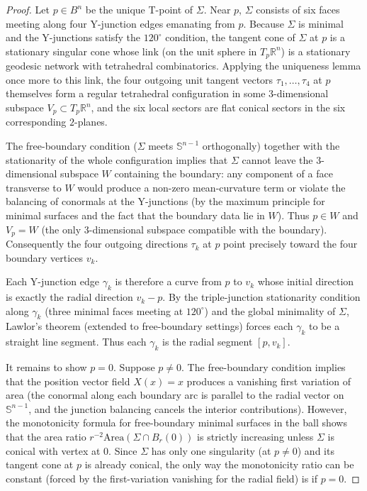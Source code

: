 \documentclass[10pt,a4paper]{amsart}
\begin{document}
\begin{proof}
Let \(p \in B^n\) be the unique T-point of \(\Sigma\). Near \(p\), \(\Sigma\) consists of six faces meeting along four Y-junction edges emanating from \(p\). Because \(\Sigma\) is minimal and the Y-junctions satisfy the \(120^\circ\) condition, the tangent cone of \(\Sigma\) at \(p\) is a stationary singular cone whose link (on the unit sphere in \(T_p\mathbb{R}^n\)) is a stationary geodesic network with tetrahedral combinatorics. Applying the uniqueness lemma once more to this link, the four outgoing unit tangent vectors \(\tau_1,\dots,\tau_4\) at \(p\) themselves form a regular tetrahedral configuration in some \(3\)-dimensional subspace \(V_p \subset T_p\mathbb{R}^n\), and the six local sectors are flat conical sectors in the six corresponding \(2\)-planes.
\medskip

The free-boundary condition (\(\Sigma\) meets \(\mathbb{S}^{n-1}\) orthogonally) together with the stationarity of the whole configuration implies that \(\Sigma\) cannot leave the \(3\)-dimensional subspace \(W\) containing the boundary: any component of a face transverse to \(W\) would produce a non-zero mean-curvature term or violate the balancing of conormals at the Y-junctions (by the maximum principle for minimal surfaces and the fact that the boundary data lie in \(W\)). Thus \(p \in W\) and \(V_p = W\) (the only \(3\)-dimensional subspace compatible with the boundary). Consequently the four outgoing directions \(\tau_k\) at \(p\) point precisely toward the four boundary vertices \(v_k\).
\medskip

Each Y-junction edge \(\gamma_k\) is therefore a curve from \(p\) to \(v_k\) whose initial direction is exactly the radial direction \(v_k - p\). By the triple-junction stationarity condition along \(\gamma_k\) (three minimal faces meeting at \(120^\circ\)) and the global minimality of \(\Sigma\), Lawlor's theorem (extended to free-boundary settings) forces each \(\gamma_k\) to be a straight line segment. Thus each \(\gamma_k\) is the radial segment \([p, v_k]\).
\medskip

It remains to show \(p = 0\). Suppose \(p \neq 0\). The free-boundary condition implies that the position vector field \(X(x) = x\) produces a vanishing first variation of area (the conormal along each boundary arc is parallel to the radial vector on \(\mathbb{S}^{n-1}\), and the junction balancing cancels the interior contributions). However, the monotonicity formula for free-boundary minimal surfaces in the ball shows that the area ratio \(r^{-2} \mathrm{Area}(\Sigma \cap B_r(0))\) is strictly increasing unless \(\Sigma\) is conical with vertex at \(0\). Since \(\Sigma\) has only one singularity (at \(p \neq 0\)) and its tangent cone at \(p\) is already conical, the only way the monotonicity ratio can be constant (forced by the first-variation vanishing for the radial field) is if \(p = 0\).
\medskip


\end{proof}
\end{document}
